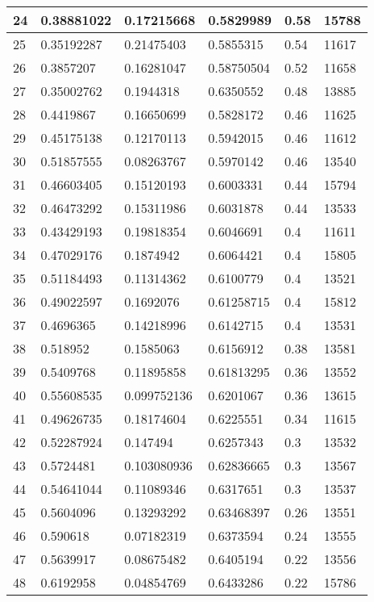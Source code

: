 \begin{longtable}{|l|l|l|l|l|l|}
24 & 0.38881022 & 0.17215668 & 0.5829989 & 0.58 & 15788 \\ \hline 
25 & 0.35192287 & 0.21475403 & 0.5855315 & 0.54 & 11617 \\ \hline 
26 & 0.3857207 & 0.16281047 & 0.58750504 & 0.52 & 11658 \\ \hline 
27 & 0.35002762 & 0.1944318 & 0.6350552 & 0.48 & 13885 \\ \hline 
28 & 0.4419867 & 0.16650699 & 0.5828172 & 0.46 & 11625 \\ \hline 
29 & 0.45175138 & 0.12170113 & 0.5942015 & 0.46 & 11612 \\ \hline 
30 & 0.51857555 & 0.08263767 & 0.5970142 & 0.46 & 13540 \\ \hline 
31 & 0.46603405 & 0.15120193 & 0.6003331 & 0.44 & 15794 \\ \hline 
32 & 0.46473292 & 0.15311986 & 0.6031878 & 0.44 & 13533 \\ \hline 
33 & 0.43429193 & 0.19818354 & 0.6046691 & 0.4 & 11611 \\ \hline 
34 & 0.47029176 & 0.1874942 & 0.6064421 & 0.4 & 15805 \\ \hline 
35 & 0.51184493 & 0.11314362 & 0.6100779 & 0.4 & 13521 \\ \hline 
36 & 0.49022597 & 0.1692076 & 0.61258715 & 0.4 & 15812 \\ \hline 
37 & 0.4696365 & 0.14218996 & 0.6142715 & 0.4 & 13531 \\ \hline 
38 & 0.518952 & 0.1585063 & 0.6156912 & 0.38 & 13581 \\ \hline 
39 & 0.5409768 & 0.11895858 & 0.61813295 & 0.36 & 13552 \\ \hline 
40 & 0.55608535 & 0.099752136 & 0.6201067 & 0.36 & 13615 \\ \hline 
41 & 0.49626735 & 0.18174604 & 0.6225551 & 0.34 & 11615 \\ \hline 
42 & 0.52287924 & 0.147494 & 0.6257343 & 0.3 & 13532 \\ \hline 
43 & 0.5724481 & 0.103080936 & 0.62836665 & 0.3 & 13567 \\ \hline 
44 & 0.54641044 & 0.11089346 & 0.6317651 & 0.3 & 13537 \\ \hline 
45 & 0.5604096 & 0.13293292 & 0.63468397 & 0.26 & 13551 \\ \hline 
46 & 0.590618 & 0.07182319 & 0.6373594 & 0.24 & 13555 \\ \hline 
47 & 0.5639917 & 0.08675482 & 0.6405194 & 0.22 & 13556 \\ \hline 
48 & 0.6192958 & 0.04854769 & 0.6433286 & 0.22 & 15786 \\ \hline 

\end{longtable}
